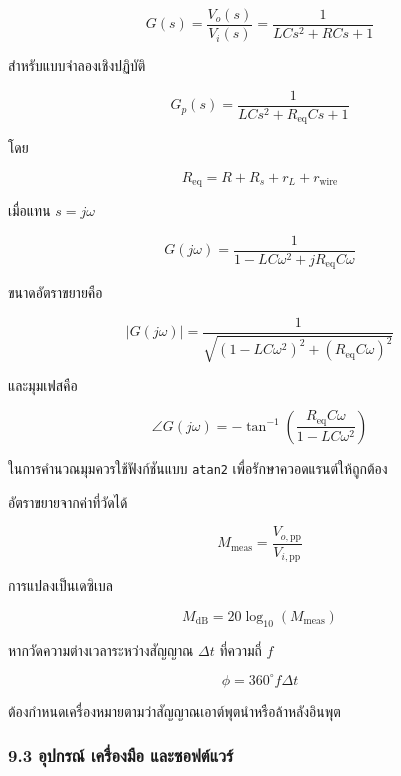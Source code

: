 \[
G(s)=\frac{V_o(s)}{V_i(s)}
=\frac{1}{LCs^2+RCs+1}
\]

สำหรับแบบจำลองเชิงปฏิบัติ

\[
G_p(s)
=
\frac{1}
{LCs^2+R_{\text{eq}}Cs+1}
\]

โดย

\[
R_{\text{eq}}=R+R_s+r_L+r_{\text{wire}}
\]

เมื่อแทน $s=j\omega$

\[
G(j\omega)
=
\frac{1}
{1-LC\omega^2+jR_{\text{eq}}C\omega}
\]

ขนาดอัตราขยายคือ

\[
|G(j\omega)|
=
\frac{1}
{\sqrt{(1-LC\omega^2)^2+(R_{\text{eq}}C\omega)^2}}
\]

และมุมเฟสคือ

\[
\angle G(j\omega)
=
-\tan^{-1}
\left(
\frac{R_{\text{eq}}C\omega}
{1-LC\omega^2}
\right)
\]

ในการคำนวณมุมควรใช้ฟังก์ชันแบบ \texttt{atan2} เพื่อรักษาควอดแรนต์ให้ถูกต้อง

อัตราขยายจากค่าที่วัดได้

\[
M_{\text{meas}}=\frac{V_{o,\text{pp}}}{V_{i,\text{pp}}}
\]

การแปลงเป็นเดซิเบล

\[
M_{\text{dB}}=20\log_{10}(M_{\text{meas}})
\]

หากวัดความต่างเวลาระหว่างสัญญาณ $\Delta t$ ที่ความถี่ $f$

\[
\phi=360^\circ f\Delta t
\]

ต้องกำหนดเครื่องหมายตามว่าสัญญาณเอาต์พุตนำหรือล้าหลังอินพุต

\subsubsection{9.3 อุปกรณ์ เครื่องมือ และซอฟต์แวร์}

